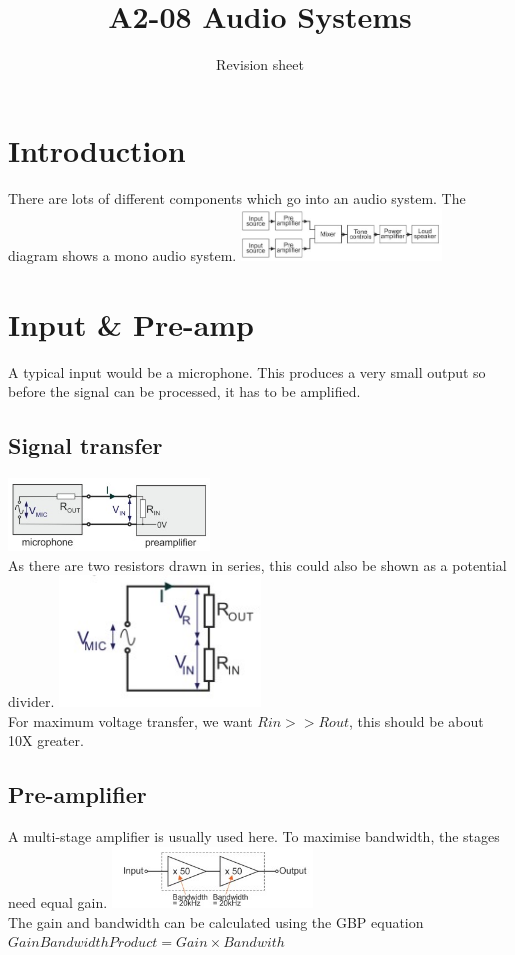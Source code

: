 \documentclass[a4paper, 11pt, twocolumn]{article}
\title{A2-08 Audio Systems}
\author{Revision sheet}
\date{}
\begin{document}
    
    \maketitle

    \section{Introduction}
    \thispagestyle{fancy}
    There are lots of different components which go into an audio system. The diagram shows a mono audio system.
    \includegraphics[width=0.4\textwidth]{monoBloc.jpg} \\
    \section{Input \& Pre-amp}
    A typical input would be a microphone. This produces a very small output so before the signal can be processed, it has to be amplified.
    \subsection{Signal transfer}
    \includegraphics[width=0.4\textwidth]{sigTrans1.jpg} \\
    As there are two resistors drawn in series, this could also be shown as a potential divider.
    \includegraphics[width=0.4\textwidth]{sigTrans2.jpg} \\
    For maximum voltage transfer, we want $Rin>>Rout$, this should be about 10X greater.
    \subsection{Pre-amplifier}
    A multi-stage amplifier is usually used here. To maximise bandwidth, the stages need equal gain.
    \includegraphics[width=0.4\textwidth]{msAmp.jpg} \\
    The gain and bandwidth can be calculated using the GBP equation
    $Gain Bandwidth Product = Gain \times Bandwith$
\end{document}
